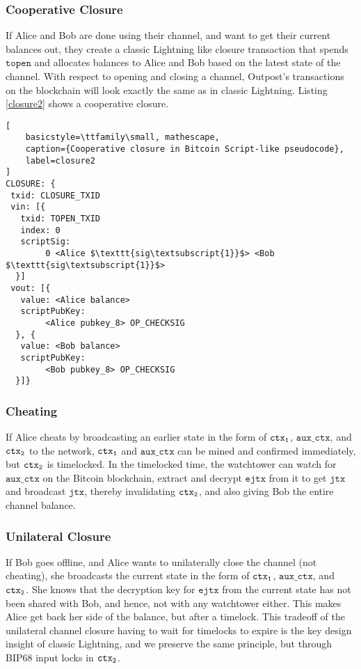 \subsubsection{Cooperative Closure}
If Alice and Bob are done using their channel, and want to get their current balances out, they create a classic Lightning like closure transaction that spends $\texttt{topen}$ and allocates balances to Alice and Bob based on the latest state of the channel. With respect to opening and closing a channel, Outpost's transactions on the blockchain will look exactly the same as in classic Lightning. Listing \ref{closure2} shows a cooperative closure.

\begin{lstlisting}[
    basicstyle=\ttfamily\small, mathescape,
    caption={Cooperative closure in Bitcoin Script-like pseudocode},
    label=closure2
]
CLOSURE: {
 txid: CLOSURE_TXID
 vin: [{
   txid: TOPEN_TXID
   index: 0
   scriptSig: 
        0 <Alice $\texttt{sig\textsubscript{1}}$> <Bob $\texttt{sig\textsubscript{1}}$>
  }]
 vout: [{
   value: <Alice balance>
   scriptPubKey: 
        <Alice pubkey_8> OP_CHECKSIG
  }, {
   value: <Bob balance>
   scriptPubKey: 
        <Bob pubkey_8> OP_CHECKSIG
  }]}
\end{lstlisting}


\subsubsection{Cheating}
If Alice cheats by broadcasting an earlier state in the form of $\texttt{ctx\textsubscript{1}}$, $\texttt{aux\_ctx}$, and $\texttt{ctx\textsubscript{2}}$ to the network, $\texttt{ctx\textsubscript{1}}$ and $\texttt{aux\_ctx}$ can be mined and confirmed immediately, but $\texttt{ctx\textsubscript{2}}$ is timelocked. In the timelocked time, the watchtower can watch for $\texttt{aux\_ctx}$ on the Bitcoin blockchain, extract and decrypt $\texttt{ejtx}$ from it to get $\texttt{jtx}$ and broadcast $\texttt{jtx}$, thereby invalidating $\texttt{ctx\textsubscript{2}}$, and also giving Bob the entire channel balance.

\subsubsection{Unilateral Closure}
If Bob goes offline, and Alice wants to unilaterally close the channel (not cheating), she broadcasts the current state in the form of $\texttt{ctx\textsubscript{1}}$, $\texttt{aux\_ctx}$, and $\texttt{ctx\textsubscript{2}}$. She knows that the decryption key for $\texttt{ejtx}$ from the current state has not been shared with Bob, and hence, not with any watchtower either. This makes Alice get back her side of the balance, but after a timelock. This tradeoff of the unilateral channel closure having to wait for timelocks to expire is the key design insight of classic Lightning, and we preserve the same principle, but through BIP68 input locks in $\texttt{ctx\textsubscript{2}}$.

